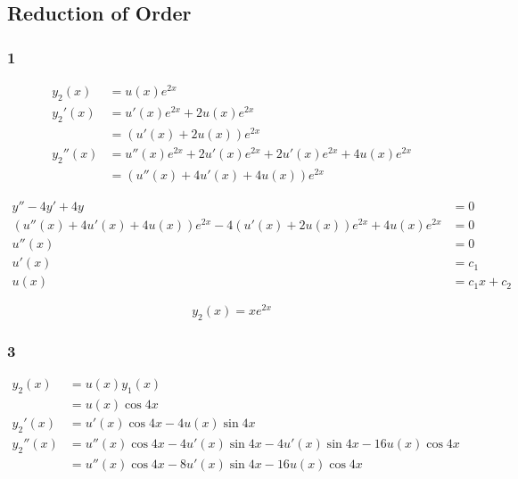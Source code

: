 \documentclass{article}
\begin{document}
\subsection{Reduction of Order}

\subsubsection{1}

\begin{align*}
  y_2(x)   & = u(x) e^{2x}                                                     \\
  y_2'(x)  & = u'(x) e^{2x} + 2 u(x) e^{2x}                                    \\
           & = (u'(x) + 2u(x)) e^{2x}                                          \\
  y_2''(x) & = u''(x) e^{2x} + 2 u'(x) e^{2x} + 2 u'(x) e^{2x} + 4 u(x) e^{2x} \\
           & = (u''(x) + 4u'(x) + 4u(x)) e^{2x}
\end{align*}

\begin{align*}
  y'' - 4y' + 4y                                                              & = 0           \\
  (u''(x) + 4u'(x) + 4u(x)) e^{2x} - 4 (u'(x) + 2u(x)) e^{2x} + 4 u(x) e^{2x} & = 0           \\
  u''(x)                                                                      & = 0           \\
  u'(x)                                                                       & = c_1         \\
  u(x)                                                                        & = c_1 x + c_2
\end{align*}

\[y_2(x) = xe^{2x}\]

\subsubsection{3}

\begin{align*}
  y_2(x)   & = u(x) y_1(x)                                                          \\
           & = u(x) \cos 4x                                                         \\
  y_2'(x)  & = u'(x) \cos 4x - 4 u(x) \sin 4x                                       \\
  y_2''(x) & = u''(x) \cos 4x - 4 u'(x) \sin 4x - 4 u'(x) \sin 4x - 16 u(x) \cos 4x \\
           & = u''(x) \cos 4x - 8 u'(x) \sin 4x - 16 u(x) \cos 4x
\end{align*}
\end{document}
